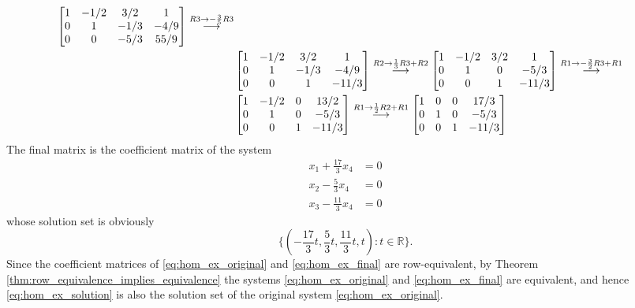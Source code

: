 \documentclass[12pt,letterpaper,reqno]{article}
\numberwithin{equation}{section}
\begin{document}
\begin{example}
\begin{align*}
{\begin{bmatrix}
		1&-1/2&3/2&1 \\ 0 & 1 & -1/3 & -4/9 \\0&0&-5/3&55/9
	\end{bmatrix} }\stackrel{\footnotesize{R3 \to -\frac{3}{5}R3}}{\longrightarrow} \\
	&\begin{bmatrix}
		1&-1/2&3/2&1 \\ 0 & 1 & -1/3 & -4/9 \\0&0&1&-11/3
	\end{bmatrix} \stackrel{\footnotesize{R2 \to \frac{1}{3}R3+R2}}{\longrightarrow}\begin{bmatrix}
		1&-1/2&3/2&1 \\ 0 & 1 & 0 & -5/3 \\0&0&1&-11/3
	\end{bmatrix}\stackrel{\footnotesize{R1 \to -\frac{3}{2}R3+R1}}{\longrightarrow}\\
	&\begin{bmatrix}
		1&-1/2&0&13/2 \\ 0 & 1 & 0 & -5/3 \\0&0&1&-11/3
	\end{bmatrix}\stackrel{\footnotesize{R1 \to \frac{1}{2}R2+R1}}{\longrightarrow}\begin{bmatrix}
		1&0&0&17/3 \\ 0 & 1 & 0 & -5/3 \\0&0&1&-11/3
	\end{bmatrix}
\end{align*}
The final matrix is the coefficient matrix of the system
\begin{equation} \label{eq:hom_ex_final}
\begin{split}
	x_1+\frac{17}{3}x_4&=0 \\
	x_2-\frac{5}{3}x_4&=0 \\
	x_3-\frac{11}{3}x_4&=0
\end{split}
\end{equation}
whose solution set is obviously 
\begin{equation}\label{eq:hom_ex_solution}
\{(-\frac{17}{3}t,\frac{5}{3}t,\frac{11}{3}t,t):t \in \mathbb{R}\}.	
\end{equation}
 Since the coefficient matrices of \eqref{eq:hom_ex_original} and \eqref{eq:hom_ex_final} are row-equivalent, by Theorem \ref{thm:row_equivalence_implies_equivalence} the systems \eqref{eq:hom_ex_original} and \eqref{eq:hom_ex_final} are equivalent, and hence \eqref{eq:hom_ex_solution} is also the solution set of the original system \eqref{eq:hom_ex_original}.
\end{example}
\end{document}
